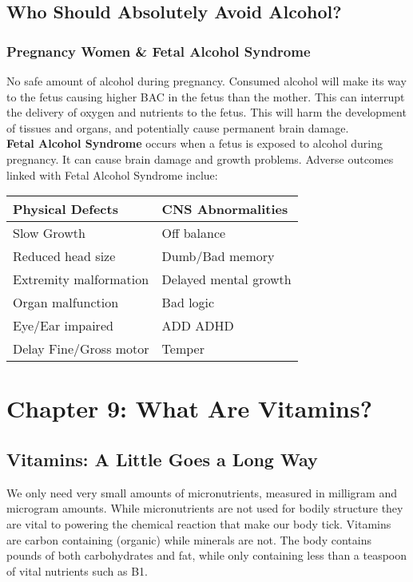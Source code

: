 \documentclass[letterpaper, 11pt]{article}
\begin{document}
\subsection{Who Should Absolutely Avoid Alcohol?}
\label{sec:org0901ade}
\subsubsection{Pregnancy Women \& Fetal Alcohol Syndrome}
\label{sec:org9d9b2c2}
No safe amount of alcohol during pregnancy. Consumed alcohol will make its way to the fetus causing higher BAC in the fetus than the mother. This can interrupt the delivery of oxygen and nutrients to the fetus. This will harm the development of tissues and organs, and potentially cause permanent brain damage.\\
\textbf{Fetal Alcohol Syndrome} occurs when a fetus is exposed to alcohol during pregnancy. It can cause brain damage and growth problems. Adverse outcomes linked with Fetal Alcohol Syndrome inclue:\\
\begin{center}
\begin{tabular}{ll}
Physical Defects & CNS Abnormalities\\
\hline
Slow Growth & Off balance\\
Reduced head size & Dumb/Bad memory\\
Extremity malformation & Delayed mental growth\\
Organ malfunction & Bad logic\\
Eye/Ear impaired & ADD ADHD\\
Delay Fine/Gross motor & Temper\\
\end{tabular}
\end{center}
\section{Chapter 9: What Are Vitamins?}
\label{sec:org9aff28b}
\subsection{Vitamins: A Little Goes a Long Way}
\label{sec:org0e7f516}
We only need very small amounts of micronutrients, measured in milligram and microgram amounts. While micronutrients are not used for bodily structure they are vital to powering the chemical reaction that make our body tick. Vitamins are carbon containing (organic) while minerals are not. The body contains pounds of both carbohydrates and fat, while only containing less than a teaspoon of vital nutrients such as B1.\\
\end{document}
